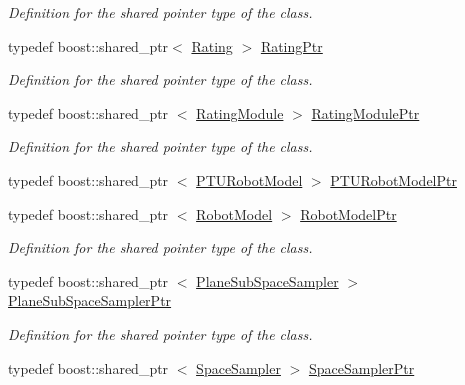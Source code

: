 \begin{DoxyCompactItemize}
\begin{DoxyCompactList}\small\item\em \-Definition for the shared pointer type of the class. \end{DoxyCompactList}\item 
typedef boost\-::shared\-\_\-ptr$<$ \hyperlink{structnext__best__view_1_1Rating}{\-Rating} $>$ \hyperlink{namespacenext__best__view_a24cf26ec1dec2cc4c167e32798d1abeb}{\-Rating\-Ptr}
\begin{DoxyCompactList}\small\item\em \-Definition for the shared pointer type of the class. \end{DoxyCompactList}\item 
typedef boost\-::shared\-\_\-ptr\*
$<$ \hyperlink{classnext__best__view_1_1RatingModule}{\-Rating\-Module} $>$ \hyperlink{namespacenext__best__view_a0fd3a238157d0632d802531f590682ec}{\-Rating\-Module\-Ptr}
\begin{DoxyCompactList}\small\item\em \-Definition for the shared pointer type of the class. \end{DoxyCompactList}\item 
typedef boost\-::shared\-\_\-ptr\*
$<$ \hyperlink{classnext__best__view_1_1PTURobotModel}{\-P\-T\-U\-Robot\-Model} $>$ \hyperlink{namespacenext__best__view_a7ee94aa7b8bb9e1c79328745b92d12b8}{\-P\-T\-U\-Robot\-Model\-Ptr}
\item 
typedef boost\-::shared\-\_\-ptr\*
$<$ \hyperlink{classnext__best__view_1_1RobotModel}{\-Robot\-Model} $>$ \hyperlink{namespacenext__best__view_ad248a43c564dbbea474aa87f0fb56b22}{\-Robot\-Model\-Ptr}
\begin{DoxyCompactList}\small\item\em \-Definition for the shared pointer type of the class. \end{DoxyCompactList}\item 
typedef boost\-::shared\-\_\-ptr\*
$<$ \hyperlink{classnext__best__view_1_1PlaneSubSpaceSampler}{\-Plane\-Sub\-Space\-Sampler} $>$ \hyperlink{namespacenext__best__view_a9195bbe041d02540324d6a4d33560eef}{\-Plane\-Sub\-Space\-Sampler\-Ptr}
\begin{DoxyCompactList}\small\item\em \-Definition for the shared pointer type of the class. \end{DoxyCompactList}\item 
typedef boost\-::shared\-\_\-ptr\*
$<$ \hyperlink{classnext__best__view_1_1SpaceSampler}{\-Space\-Sampler} $>$ \hyperlink{namespacenext__best__view_af3d0f8204bad3e34940c86ba619815cc}{\-Space\-Sampler\-Ptr}

\end{DoxyCompactItemize}
